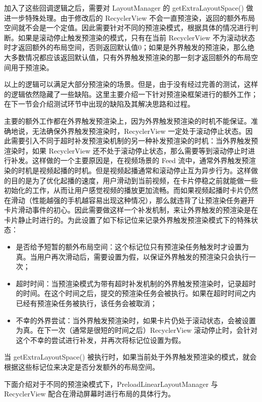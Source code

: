 加入了这些回调逻辑之后，需要对 LayoutManager 的 getExtraLayoutSpace() 做进一步特殊处理。由于修改后的 RecyclerView 不会一直预渲染，返回的额外布局空间就不会是一个定值。因此需要针对不同的预渲染模式，根据具体的情况进行判断。如果是滚动停止触发预渲染的模式，只有在当前 RecyclerView 不为滚动状态时才返回额外的布局空间，否则返回默认值0；如果是外界触发的预渲染，那么绝大多数情况都应该返回默认值，只有外界触发预渲染的那一刻才返回额外的布局空间用于预渲染。

以上的逻辑可以满足大部分预渲染的场景。但是，由于没有经过完善的测试，这样的逻辑依然隐藏了一些缺陷。这里主要介绍一下针对预渲染框架进行的额外工作；在下一节会介绍测试环节中出现的缺陷及其解决思路和过程。

主要的额外工作都在外界触发预渲染上，因为外界触发预渲染的时机不能保证。准确地说，无法确保外界触发预渲染时，RecyclerView 一定处于滚动停止状态。因此需要引入不同于超时补发预渲染机制的另一种补发预渲染的时机：当外界触发预渲染时，如果 RecyclerView 还不处于滚动停止状态，那么需要等到滚动停止时进行补发。这样做的一个主要原因是，在视频场景的 Feed 流中，通常外界触发预渲染的时机是视频起播的时机。但是视频起播通常和滚动停止互为异步行为。这样做的目的是为了优化起播的速度，用户滑动到当前视频，在卡片停稳之前就能做一些初始化的工作，从而让用户感觉视频的播放更加流畅。而如果视频起播时卡片仍然在滑动（性能越强的手机越容易出现这种情况），那么就违背了让预渲染任务避开卡片滑动事件的初心。因此需要做这样一个补发机制，来让外界触发的预渲染是在卡片静止时进行的。为此设置了如下标记位来记录外界触发预渲染模式下的特殊状态：

\begin{itemize}
    \item 是否给予短暂的额外布局空间：这个标记位只有预渲染任务触发时才设置为真。当用户再次滑动后，需要设置为假，以保证外界触发的预渲染只会执行一次；
    \item 超时时间：当预渲染模式为带有超时补发机制的外界触发预渲染时，记录超时的时间。在这个时间之后，提交的预渲染任务会被执行。如果在超时时间之内已经有预渲染任务被执行，该任务会被取消；
    \item 不幸的外界尝试：当外界触发预渲染时，如果卡片仍处于滚动状态，会被设置为真。在下一次（通常是很短的时间之后）RecyclerView 滚动停止时，会针对这个不幸的尝试进行补发，并再次将标记位设置为假。
\end{itemize}

当 getExtraLayoutSpace() 被执行时，如果当前处于外界触发预渲染的模式，就会根据这些标记位来决定是否分发额外的布局空间。

下面介绍对于不同的预渲染模式下，PreloadLinearLayoutManager 与 RecyclerView 配合在滑动屏幕时进行布局的具体行为。

